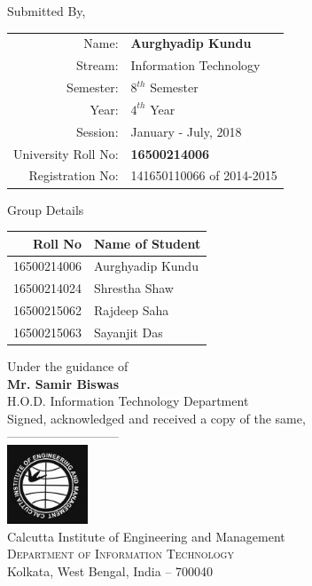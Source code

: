 \documentclass[11pt, a4paper]{thesis}
\begin{document}
\begin{titlepage}
\begin{center}
Submitted By,\\
\begin{table}[h]
\centering
\begin{tabular}{| r | l |}
\hline
Name: & \textbf{Aurghyadip Kundu}\\
Stream: & Information Technology\\ 
Semester: & $8^{th}$ Semester\\
Year: & $4^{th}$ Year\\
Session: & January - July, 2018\\
University Roll No: & \textbf{16500214006}\\
Registration No: & 141650110066 of 2014-2015\\ \hline
\end{tabular}
\end{table}
\normalsize Group Details\\
\begin{table}[h]
\centering
\begin{tabular}{| r | l |}
\hline
\textbf{Roll No} & \textbf{Name of Student} \\ \hline
16500214006 & Aurghyadip Kundu \\
16500214024 & Shrestha Shaw \\ 
16500215062 & Rajdeep Saha \\
16500215063 & Sayanjit Das\\ \hline
\end{tabular}
\end{table}
\vspace{.1in}
{\normal Under the guidance of}\\
\textbf{Mr. Samir Biswas}\\
H.O.D. Information Technology Department\\
\vfill
Signed, acknowledged and received a copy of the same,\\
\vspace{0.5in}
---------------------------\\
\vfill
\includegraphics[width=0.18\textwidth]{ciem-logo.jpg}\\[0.1in]
\Large{Calcutta Institute of Engineering and Management}\\
\normalsize
\textsc{Department of Information Technology}\\
Kolkata, West Bengal, India -- 700040 \\
\vspace{0.2cm}

\end{center}

\end{titlepage}
\end{document}
